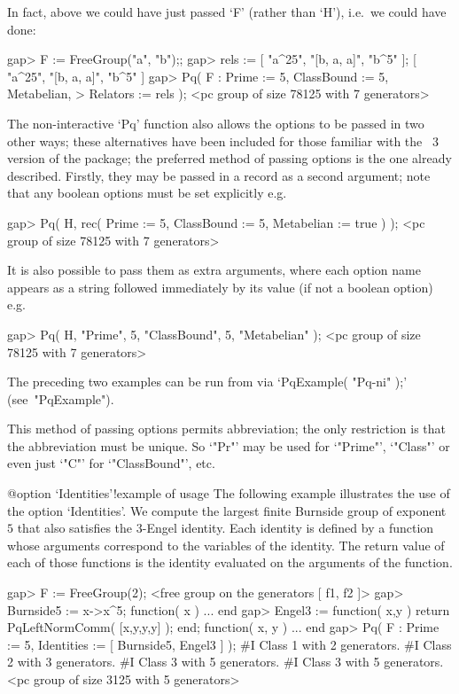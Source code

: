 In fact, above we could have just passed `F' (rather than  `H'),  i.e.~we
could have done:

\beginexample
gap> F := FreeGroup("a", "b");;
gap> rels := [ "a^25", "[b, a, a]", "b^5" ];
[ "a^25", "[b, a, a]", "b^5" ]
gap> Pq( F : Prime := 5, ClassBound := 5, Metabelian, 
>            Relators := rels );
<pc group of size 78125 with 7 generators>
\endexample

The non-interactive `Pq' function also allows the options to be passed in
two other ways; these alternatives have been included for those  familiar
with the {\GAP}~3 version of the {\ANUPQ} package; the  preferred  method
of passing options is the one already described.  Firstly,  they  may  be
passed in a record as a second argument; note that  any  boolean  options
must be set explicitly e.g.

\beginexample
gap> Pq( H, rec( Prime := 5, ClassBound := 5, Metabelian := true ) );
<pc group of size 78125 with 7 generators>
\endexample

It is also possible to pass them as extra arguments,  where  each  option
name appears as a string followed immediately by  its  value  (if  not  a
boolean option) e.g.

\beginexample
gap> Pq( H, "Prime", 5, "ClassBound", 5, "Metabelian" );             
<pc group of size 78125 with 7 generators>
\endexample

The preceding two examples can be run from {\GAP} via `PqExample( "Pq-ni"
);' (see~"PqExample").

This method of passing options permits abbreviation; the only restriction
is that the abbreviation must be  unique.  So  `"Pr"'  may  be  used  for
`"Prime"', `"Class"' or even just `"C"' for `"ClassBound"', etc.

%
{@option \noexpand`Identities'!example of usage}
The following example illustrates the use of the option `Identities'.  We
compute the largest finite Burnside  group  of  exponent  $5$  that  also
satisfies the $3$-Engel identity. Each identity is defined by a  function
whose arguments correspond to the variables of the identity.  The  return
value of each of  those  functions  is  the  identity  evaluated  on  the
arguments of the function.

\beginexample
gap> F := FreeGroup(2);
<free group on the generators [ f1, f2 ]>
gap> Burnside5 := x->x^5;
function( x ) ... end
gap> Engel3 := function( x,y ) return PqLeftNormComm( [x,y,y,y] ); end;
function( x, y ) ... end
gap> Pq( F : Prime := 5, Identities := [ Burnside5, Engel3 ] );
#I  Class 1 with 2 generators.
#I  Class 2 with 3 generators.
#I  Class 3 with 5 generators.
#I  Class 3 with 5 generators.
<pc group of size 3125 with 5 generators>
\endexample

